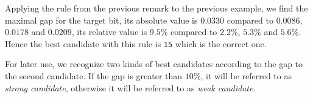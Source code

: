 	Applying the rule from the previous remark to the previous example, we find the maximal gap for the  target bit, its absolute value is $0.0330$ compared to $0.0086$, $0.0178$ and $0.0209$, its relative value is $9.5\%$ compared to $2.2\%$, $5.3\%$ and $5.6\%$. Hence the best candidate with this rule is {\tt 15} which is the correct one.
	
	\begin{note}
	\label{note:strong}
		For later use, we recognize two kinds of best candidates according to the gap to the second candidate. If the gap is greater than $10\%$, it will be referred to as {\em strong candidate}, otherwise it will be referred to as {\em weak candidate}.
	\end{note}